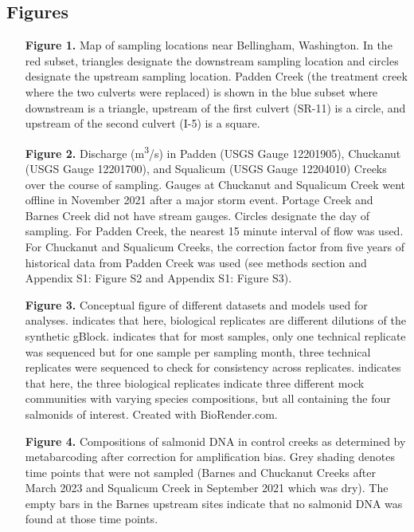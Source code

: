 \documentclass[
]{article}
\begin{document}
\newpage

\hypertarget{figures}{%
\subsection{Figures}\label{figures}}

\begin{itemize}
\setlength{\itemindent}{4em}
\item[\textbf{Figure 1.}] Map of sampling locations near Bellingham, Washington. In the red subset, triangles designate the downstream sampling location and circles designate the upstream sampling location. Padden Creek (the treatment creek where the two culverts were replaced) is shown in the blue subset where downstream is a triangle, upstream of the first culvert (SR-11) is a circle, and upstream of the second culvert (I-5) is a square.
\item[\textbf{Figure 2.}] Discharge (m\textsuperscript{3}/s) in Padden (USGS Gauge 12201905), Chuckanut (USGS Gauge 12201700), and Squalicum (USGS Gauge 12204010) Creeks over the course of sampling. Gauges at Chuckanut and Squalicum Creek went offline in November 2021 after a major storm event. Portage Creek and Barnes Creek did not have stream gauges. Circles designate the day of sampling. For Padden Creek, the nearest 15 minute interval of flow was used. For Chuckanut and Squalicum Creeks, the correction factor from five years of historical data from Padden Creek was used (see methods section and Appendix S1: Figure S2 and Appendix S1: Figure S3).
\item[\textbf{Figure 3.}] Conceptual figure of different datasets and models used for analyses. \* indicates that here, biological replicates are different dilutions of the synthetic gBlock. \*\* indicates that for most samples, only one technical replicate was sequenced but for one sample per sampling month, three technical replicates were sequenced to check for consistency across replicates. \*\*\* indicates that here, the three biological replicates indicate three different mock communities with varying species compositions, but all containing the four salmonids of interest. Created with BioRender.com.
\item[\textbf{Figure 4.}] Compositions of salmonid DNA in control creeks as determined by metabarcoding after correction for amplification bias. Grey shading denotes time points that were not sampled (Barnes and Chuckanut Creeks after March 2023 and Squalicum Creek in September 2021 which was dry). The empty bars in the Barnes upstream sites indicate that no salmonid DNA was found at those time points.

\end{itemize}
\end{document}
